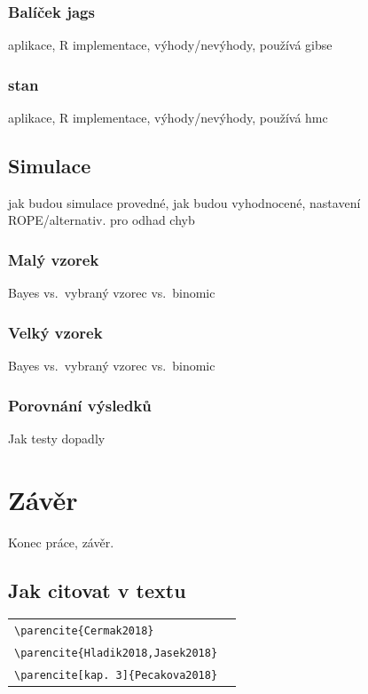 \documentclass[
  11pt,
  a4paper]{report}
\begin{document}
\subsection{Balíček jags}\label{baluxedux10dek-jags}

aplikace, R implementace, výhody/nevýhody, používá gibse

\subsection{stan}\label{stan}

aplikace, R implementace, výhody/nevýhody, používá hmc

\section{Simulace}\label{simulace}

jak budou simulace provedné, jak budou vyhodnocené, nastavení
ROPE/alternativ. pro odhad chyb

\subsection{Malý vzorek}\label{maluxfd-vzorek}

Bayes vs.~vybraný vzorec vs.~binomic

\subsection{Velký vzorek}\label{velkuxfd-vzorek}

Bayes vs.~vybraný vzorec vs.~binomic

\subsection{Porovnání výsledků}\label{porovnuxe1nuxed-vuxfdsledkux16f}

Jak testy dopadly

{
\pagestyle{plain}
\chapter*{Závěr}

Konec práce, závěr.

\section{Jak citovat v textu}
\begin{center}
\begin{tabularx}{\textwidth}{l@{~~$\longrightarrow$~~}X}
\verb|\parencite{Cermak2018}|&\parencite{Cermak2018}\\
\verb|\parencite{Hladik2018,Jasek2018}|&\parencite{Hladik2018,Jasek2018}\\
\verb|\parencite[kap. 3]{Pecakova2018}|&\parencite[kap. 3]{Pecakova2018}\\
\end{tabularx}
\end{center}

}
\end{document}
